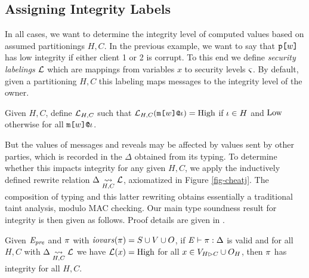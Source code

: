 \cheatjfig

\subsection{Assigning Integrity Labels}

In all cases, we want to determine the integrity level of computed
values based on assumed partitionings $H,C$. In the previous example,
we want to say that $\texttt{p[}w\texttt{]}$ has low integrity if either client 1 or
2 is corrupt.  To this end we define \emph{security labelings}
$\mathcal{L}$ which are mappings from variables $x$ to security levels
$\varsigma$. By default, given a partitioning $H,C$ this labeling maps
messages to the integrity level of the owner.
\begin{definition}  
  Given $H,C$,
  define $\mathcal{L}_{H,C}$ such that $\mathcal{L}_{H,C}(\texttt{m[}w\texttt{]}\texttt{@}\iota ) = \mathrm{High}$
  if $\iota \in H$  and $\mathrm{Low}$
  otherwise for all $\texttt{m[}w\texttt{]}\texttt{@}\iota$.
\end{definition}
But the values of messages and reveals may be affected by values sent
by other parties, which is recorded in the $\Delta$ obtained from its
typing. To determine whether this impacts integrity for any given
$H,C$, we apply the inductively defined rewrite relation
$\Delta \underset{H,C}{\leadsto} \mathcal{L}$, axiomatized in Figure
\ref{fig-cheatj}. The composition of typing and this latter rewriting
obtains essentially a traditional taint analysis, modulo MAC checking.
Our main type soundness result for integrity is then given as follows.
Proof details are given in \cite{skalka2025smtboostedsecuritytypeslowlevel}.
\begin{theorem}
  \label{theorem-ipj}
  Given  $\mathit{E}_{\mathit{pre}}$ and $\pi$ with
  $\mathit{iovars}(\pi) = S \cup V \cup O$, if
  $\mathit{E} \vdash \pi : \Delta$ is valid
  and for all $H,C$ with $\Delta \underset{H,C}{\leadsto} \mathcal{L}$ 
  we have $\mathcal{L}(x) = \mathrm{High}$ for all $x \in V_{H \rhd C} \cup O_H$, then $\pi$
  has integrity for all $H,C$.
\end{theorem}
